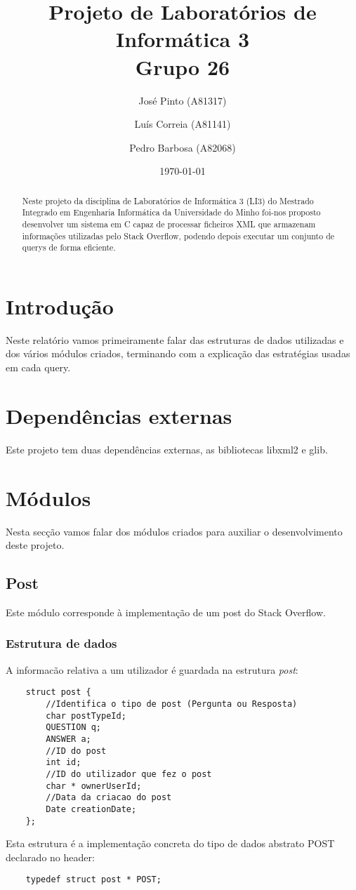 \documentclass[10pt]{article}
\title{Projeto de Laboratórios de Informática 3\\Grupo 26}
\author{José Pinto (A81317) \and Luís Correia (A81141) \and Pedro Barbosa (A82068)}
\date{\today}
\begin{document}
\maketitle

\begin{abstract}
  Neste projeto da disciplina de Laboratórios de Informática 3 (LI3) do Mestrado Integrado em Engenharia Informática da Universidade do Minho foi-nos proposto desenvolver um sistema em C capaz de processar ficheiros XML que armazenam informações utilizadas pelo Stack Overflow, podendo depois executar um conjunto de querys de forma eficiente.
\end{abstract}

\tableofcontents

\section{Introdução}
\label{sec:intro}

Neste relatório vamos primeiramente falar das estruturas de dados utilizadas e dos vários módulos criados, terminando com a explicação das estratégias usadas em cada query.  

\section{Dependências externas}
\label{sec:dependencias}

Este projeto tem duas dependências externas, as bibliotecas libxml2 e glib.

\section{Módulos}
\label{sec:modulos}

Nesta secção vamos falar dos módulos criados para auxiliar o desenvolvimento deste projeto.

\subsection{Post}

	Este módulo corresponde à implementação de um post do Stack Overflow.
\subsubsection{Estrutura de dados}
	A informacão relativa a um utilizador é guardada na estrutura \emph{post}:
	\begin{lstlisting}
	struct post {
		//Identifica o tipo de post (Pergunta ou Resposta)
		char postTypeId;
		QUESTION q; 
		ANSWER a; 
		//ID do post 
		int id;
		//ID do utilizador que fez o post 
		char * ownerUserId;
		//Data da criacao do post 
		Date creationDate;
	};
	\end{lstlisting}
	Esta estrutura é a implementação concreta do tipo de dados abstrato POST declarado no header:
	\begin{lstlisting} 
	typedef struct post * POST;
	\end{lstlisting}
\end{document}
